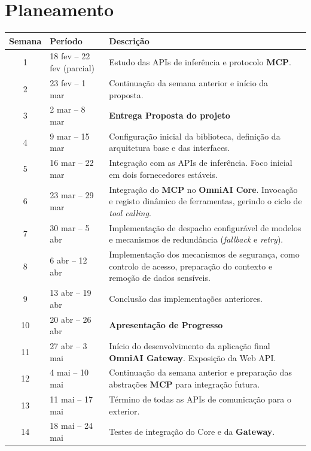     \section{Planeamento}
    \begin{table}[H]
        \centering
        \footnotesize
        \renewcommand{\arraystretch}{1.2}
        \begin{tabular}{|c|l|p{11.0cm}|}
            \hline
            \textbf{Semana} & \textbf{Período} & \textbf{Descrição} \\
            \hline
            1 & 18 fev -- 22 fev (parcial) & Estudo das APIs de inferência e protocolo \textbf{MCP}. \\
            2 & 23 fev -- 1 mar & Continuação da semana anterior e início da proposta. \\
            3 & 2 mar -- 8 mar & \textbf{Entrega Proposta do projeto} \\
            4 & 9 mar -- 15 mar & Configuração inicial da biblioteca, definição da arquitetura base e das interfaces. \\
            5 & 16 mar -- 22 mar & Integração com as APIs de inferência. Foco inicial em dois fornecedores estáveis. \\
            6 & 23 mar -- 29 mar & Integração do \textbf{MCP} no \textbf{OmniAI Core}. Invocação e registo dinâmico de ferramentas, gerindo o ciclo de \textit{tool calling}. \\
            7 & 30 mar -- 5 abr & Implementação de despacho configurável de modelos e mecanismos de redundância (\textit{fallback} e \textit{retry}). \\
            8 & 6 abr -- 12 abr & Implementação dos mecanismos de segurança, como controlo de acesso, preparação do contexto e remoção de dados sensíveis. \\
            9 & 13 abr -- 19 abr & Conclusão das implementações anteriores. \\
            10 & 20 abr -- 26 abr & \textbf{Apresentação de Progresso} \\
            11 & 27 abr -- 3 mai & Início do desenvolvimento da aplicação final \textbf{OmniAI Gateway}. Exposição da Web API. \\
            12 & 4 mai -- 10 mai & Continuação da semana anterior e preparação das abstrações \textbf{MCP} para integração futura. \\
            13 & 11 mai -- 17 mai & Término de todas as APIs de comunicação para o exterior. \\
            14 & 18 mai -- 24 mai & Testes de integração do Core e da \textbf{Gateway}. \\

\end{tabular}
\end{table}
